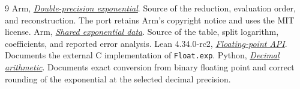 \begin{thebibliography}{9}
 Arm,
\href{https://github.com/ARM-software/optimized-routines/blob/master/math/exp.c}{\emph{Double-precision exponential}}.
Source of the reduction, evaluation order, and reconstruction.  The port
retains Arm's copyright notice and uses the MIT license.
 Arm,
\href{https://github.com/ARM-software/optimized-routines/blob/master/math/exp_data.c}{\emph{Shared exponential data}}.
Source of the table, split logarithm, coefficients, and reported error analysis.
 Lean 4.34.0-rc2,
\href{https://github.com/leanprover/lean4/blob/v4.34.0-rc2/src/Init/Data/Float/Float.lean}{\emph{Floating-point API}}.
Documents the external C implementation of \texttt{Float.exp}.
 Python,
\href{https://docs.python.org/3/library/decimal.html#decimal.Decimal.exp}{\emph{Decimal arithmetic}}.
Documents exact conversion from binary floating point and correct rounding
of the exponential at the selected decimal precision.
\end{thebibliography}

